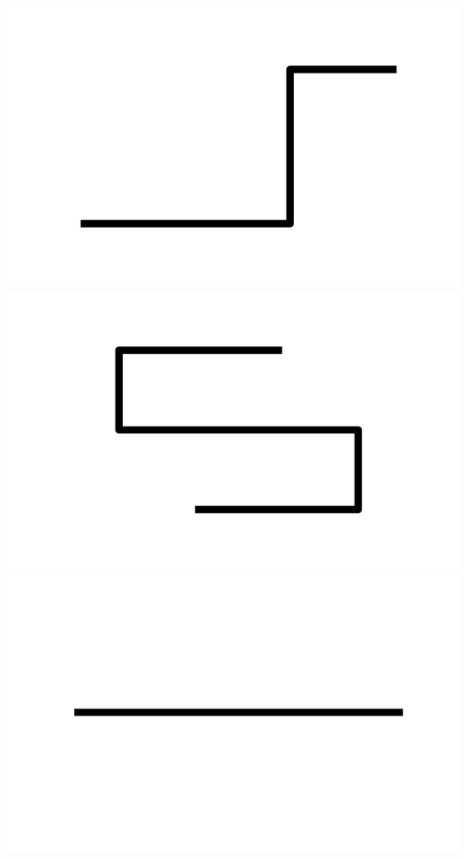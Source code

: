 \documentclass[]{report}
\begin{document}
\includegraphics[scale=.1]{pictures/21/state_cluster_shapes_154.pdf} 
\includegraphics[scale=.1]{pictures/21/state_cluster_shapes_155.pdf} 
\includegraphics[scale=.1]{pictures/21/state_cluster_shapes_156.pdf} 
\end{document}
